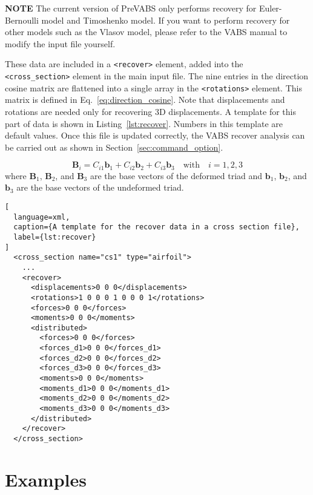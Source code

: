 \documentclass{book}
\begin{document}
\textbf{NOTE} The current version of PreVABS only performs recovery for 
Euler-Bernoulli model and Timoshenko model. If you want to perform recovery 
for other models such as the Vlasov model, please refer to the VABS manual 
to modify the input file yourself.

These data are included in a \lstinline{<recover>} element, added into 
the \lstinline{<cross_section>} element in the main input file. The nine 
entries in the direction cosine matrix are flattened into a single array 
in the \lstinline{<rotations>} element. This matrix is defined in 
Eq.~\eqref{eq:direction_cosine}. Note that displacements and rotations 
are needed only for recovering 3D displacements. A template for this part 
of data is shown in Listing~\ref{lst:recover}. Numbers in this template 
are default values. Once this file is updated correctly, the VABS recover 
analysis can be carried out as shown in Section~\ref{sec:command_option}.

\begin{equation} \label{eq:direction_cosine}
  \mathbf{B}_i = C_{i1} \mathbf{b}_1 + C_{i2} \mathbf{b}_2 + C_{i3} \mathbf{b}_3 \quad \text{with} \quad i = 1, 2, 3
\end{equation}
where $\mathbf{B}_1$, $\mathbf{B}_2$, and $\mathbf{B}_3$ are the base 
vectors of the deformed triad and $\mathbf{b}_1$, $\mathbf{b}_2$, and 
$\mathbf{b}_3$ are the base vectors of the undeformed triad.

\begin{lstlisting}[
  language=xml,
  caption={A template for the recover data in a cross section file},
  label={lst:recover}
]
  <cross_section name="cs1" type="airfoil">
    ...
    <recover>
      <displacements>0 0 0</displacements>
      <rotations>1 0 0 0 1 0 0 0 1</rotations>
      <forces>0 0 0</forces>
      <moments>0 0 0</moments>
      <distributed>
        <forces>0 0 0</forces>
        <forces_d1>0 0 0</forces_d1>
        <forces_d2>0 0 0</forces_d2>
        <forces_d3>0 0 0</forces_d3>
        <moments>0 0 0</moments>
        <moments_d1>0 0 0</moments_d1>
        <moments_d2>0 0 0</moments_d2>
        <moments_d3>0 0 0</moments_d3>
      </distributed>
    </recover>
  </cross_section>
\end{lstlisting}


\chapter{Examples}
\end{document}
